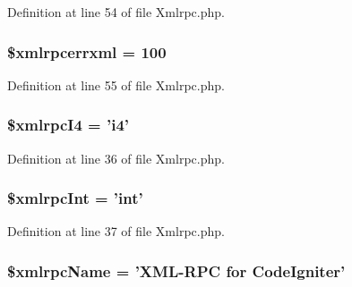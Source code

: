 Definition at line 54 of file Xmlrpc.\-php.

\hypertarget{class_c_i___xmlrpc_af2500be600bfad88988409e6ff64c01c}{
\subsubsection[{\$xmlrpcerrxml}]{\setlength{\rightskip}{0pt plus 5cm}\$xmlrpcerrxml = 100}}\label{class_c_i___xmlrpc_af2500be600bfad88988409e6ff64c01c}


Definition at line 55 of file Xmlrpc.\-php.

\hypertarget{class_c_i___xmlrpc_a4d41d61a02c60406c56254f0988b8141}{
\subsubsection[{\$xmlrpc\-I4}]{\setlength{\rightskip}{0pt plus 5cm}\$xmlrpc\-I4 = 'i4'}}\label{class_c_i___xmlrpc_a4d41d61a02c60406c56254f0988b8141}


Definition at line 36 of file Xmlrpc.\-php.

\hypertarget{class_c_i___xmlrpc_a1bf451bf41226cf1702f54fa46b041f2}{
\subsubsection[{\$xmlrpc\-Int}]{\setlength{\rightskip}{0pt plus 5cm}\$xmlrpc\-Int = '{\bf int}'}}\label{class_c_i___xmlrpc_a1bf451bf41226cf1702f54fa46b041f2}


Definition at line 37 of file Xmlrpc.\-php.

\hypertarget{class_c_i___xmlrpc_a1311a8891b845bf89b1bc459d54a6312}{
\subsubsection[{\$xmlrpc\-Name}]{\setlength{\rightskip}{0pt plus 5cm}\$xmlrpc\-Name = 'X\-M\-L-\/R\-P\-C {\bf for} Code\-Igniter'}}\label{class_c_i___xmlrpc_a1311a8891b845bf89b1bc459d54a6312}


